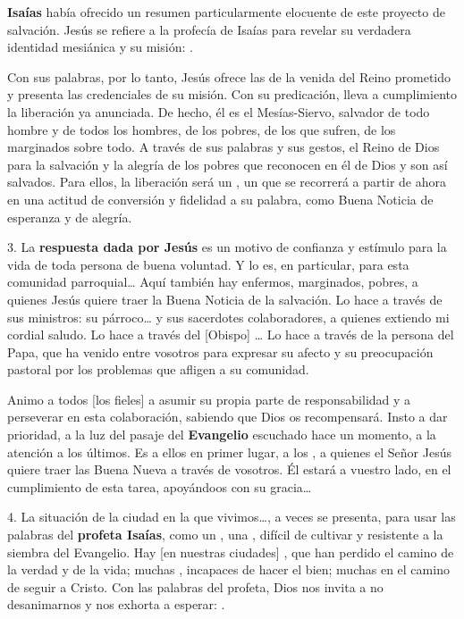 \begin{body}
\begin{body}
\textbf{Isaías} había ofrecido un resumen particularmente elocuente de este proyecto de salvación. Jesús se refiere a la profecía de Isaías para revelar su verdadera identidad mesiánica y su misión: .

Con sus palabras, por lo tanto, Jesús ofrece las  de la venida del Reino prometido y presenta las credenciales de su misión. Con su predicación, lleva a cumplimiento la liberación ya anunciada. De hecho, él es el Mesías-Siervo, salvador de todo hombre y de todos los hombres, de los pobres, de los que sufren, de los marginados sobre todo. A través de sus palabras y sus gestos, el Reino de Dios  para la salvación y la alegría de los pobres que reconocen en él  de Dios y son así salvados. Para ellos, la liberación será un , un  que se recorrerá a partir de ahora en una actitud de conversión y fidelidad a su palabra, como Buena Noticia de esperanza y de alegría.

3. La \textbf{respuesta dada por Jesús} es un motivo de confianza y estímulo para la vida de toda persona de buena voluntad. Y lo es, en particular, para esta comunidad parroquial\ldots{} Aquí también hay enfermos, marginados, pobres, a quienes Jesús quiere traer la Buena Noticia de la salvación. Lo hace a través de sus ministros: su párroco\ldots{} y sus sacerdotes colaboradores, a quienes extiendo mi cordial saludo. Lo hace a través del {[}Obispo{]} \ldots{} Lo hace a través de la persona del Papa, que ha venido entre vosotros para expresar su afecto y su preocupación pastoral por los problemas que afligen a su comunidad.

Animo a todos {[}los fieles{]} a asumir su propia parte de responsabilidad y a perseverar en esta colaboración, sabiendo que Dios os recompensará. Insto a dar prioridad, a la luz del pasaje del \textbf{Evangelio} escuchado hace un momento, a la atención a los últimos. Es a ellos en primer lugar, a los , a quienes el Señor Jesús quiere traer las Buena Nueva a través de vosotros. Él estará a vuestro lado, en el cumplimiento de esta tarea, apoyándoos con su gracia\ldots{}

4. La situación de la ciudad en la que vivimos\ldots{}, a veces se presenta, para usar las palabras del \textbf{profeta Isaías}, como un , una , difícil de cultivar y resistente a la siembra del Evangelio. Hay {[}en nuestras ciudades{]} , que han perdido el camino de la verdad y de la vida; muchas , incapaces de hacer el bien; muchas  en el camino de seguir a Cristo. Con las palabras del profeta, Dios nos invita a no desanimarnos y nos exhorta a esperar: .


\end{body}
\end{body}
